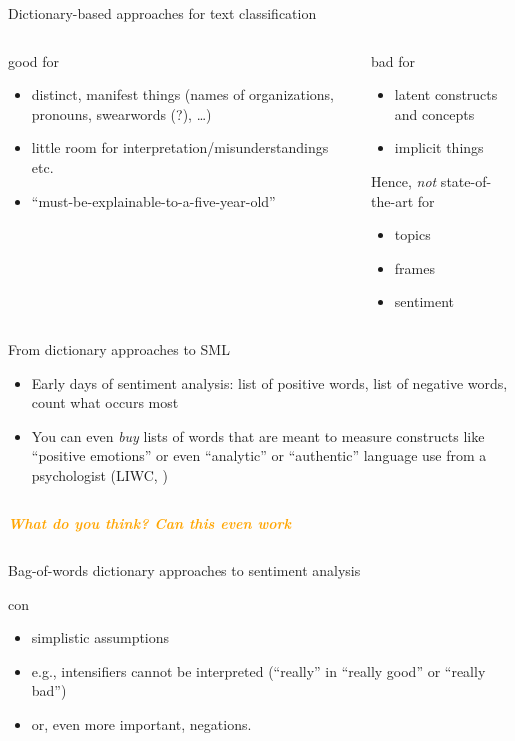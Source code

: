 \documentclass[compress]{beamer}
\newcommand{\question}[1]{
	\begin{frame}[plain]
		\begin{columns}
			\column{.3\textwidth}
			\makebox[\columnwidth]{
				\texttt{[image: mannetje.png]}}
			\column{.7\textwidth}
			\large
			\textcolor{orange}{\textbf{\emph{#1}}}
		\end{columns}
\end{frame}}
\begin{document}
\begin{frame}{Dictionary-based approaches for text classification}
\begin{columns}[t]
	\begin{block}{good for}
\begin{itemize}
	\item distinct, manifest things (names of organizations, pronouns, swearwords (?), \ldots)
	\item little room for interpretation/misunderstandings etc.
	\item ``must-be-explainable-to-a-five-year-old''
\end{itemize}
\pause
	\end{block}
	\begin{alertblock}{bad for}
		\begin{itemize}
			\item latent constructs and concepts
			\item implicit things
		\end{itemize}
			\pause
			Hence, \emph{not} state-of-the-art for
		\begin{itemize}
			\item topics
			\item frames
			\item sentiment
		\end{itemize}
\end{alertblock}
\end{columns}
\end{frame}


\begin{frame}{From dictionary approaches to SML}
\begin{itemize}[<+->]
	\item Early days of sentiment analysis: list of positive words, list of negative words, count what occurs most
	\item You can even \textit{buy} lists of words that are meant to measure constructs like ``positive emotions'' or even ``analytic'' or ``authentic'' language use from a psychologist (LIWC, \cite{Pennebaker2007})
\end{itemize}
\end{frame}

\question{What do you think? Can this even work}





\begin{frame}{Bag-of-words dictionary approaches to sentiment analysis}
	\begin{block}{con}
		\begin{itemize}
			\item simplistic assumptions
			\item e.g., intensifiers cannot be interpreted (``really'' in ``really good'' or ``really bad'')
			\item or, even more important, negations.
		\end{itemize}
	\end{block}
\end{frame}
\end{document}
